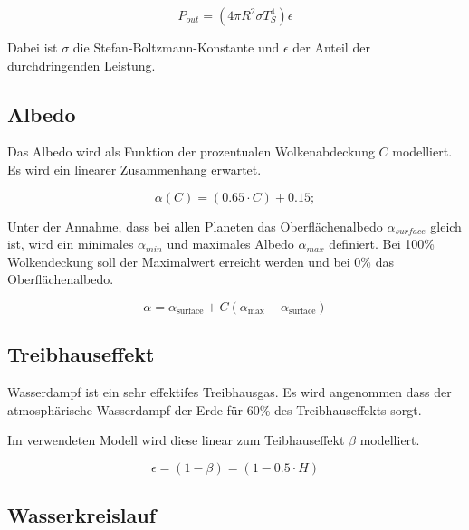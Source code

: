\begin{refsection}
\begin{equation}
P_{out} = (4 \pi R^2 \sigma T_{S}^4)\epsilon
\end{equation}

Dabei ist $\sigma$ die Stefan-Boltzmann-Konstante und $\epsilon$ der Anteil der durchdringenden Leistung.

\subsection{Albedo}

Das Albedo wird als Funktion der prozentualen Wolkenabdeckung $C$ modelliert. Es wird ein linearer Zusammenhang erwartet.

\begin{equation}
\alpha(C) = (0.65 \cdot C) + 0.15;
\end{equation}


Unter der Annahme, dass bei allen Planeten das Oberflächenalbedo $\alpha_{surface}$ gleich ist, wird ein minimales $\alpha_{min}$ und maximales Albedo $\alpha_{max}$ definiert. Bei 100\% Wolkendeckung soll der Maximalwert erreicht werden und bei 0\% das Oberflächenalbedo.

\begin{equation}
\alpha = \alpha_{\text{surface}} + C(\alpha_{\text{max}} - \alpha_{\text{surface}})
\end{equation}

\subsection{Treibhauseffekt}

Wasserdampf ist ein sehr effektifes Treibhausgas. Es wird angenommen dass der atmosphärische Wasserdampf der Erde für 60\% des Treibhauseffekts sorgt.  


Im verwendeten Modell wird diese linear zum Teibhauseffekt $\beta$ modelliert.

\begin{equation}
\epsilon  = (1 - \beta) = (1 - 0.5 \cdot H)
\end{equation}

\subsection{Wasserkreislauf}


\end{refsection}
